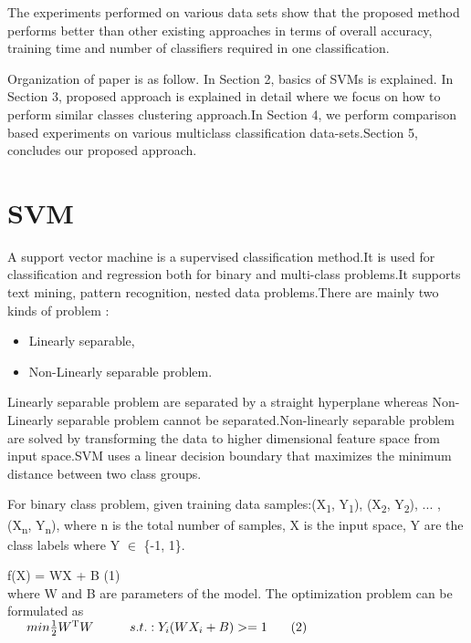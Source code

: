 \documentclass[a4paper, 10pt, conference]{ieeeconf}      %
\begin{document}
The experiments performed on various data sets show that the proposed method performs better than other existing approaches in terms of overall accuracy,  training time and number of classifiers required in one classification.

\par
Organization of paper is as follow. In Section 2, basics of SVMs is explained. In Section 3, proposed approach is explained in detail where we focus on how to perform similar classes clustering approach.In Section 4, we perform comparison based experiments on various multiclass classification data-sets.Section 5, concludes our proposed approach.


\section{SVM}

A support vector machine is a supervised classification method.It is used for classification and regression both for binary and multi-class problems.It supports text mining, pattern recognition, nested data problems.There are mainly two kinds of problem : \begin{itemize}
\item Linearly separable, 
\item Non-Linearly separable problem.
\end{itemize}
Linearly separable problem are separated by a straight hyperplane whereas Non-Linearly separable problem cannot be separated.Non-linearly separable problem are solved by transforming the data to higher dimensional feature space from input space.SVM uses a linear decision boundary that maximizes the minimum distance between two class groups.
\par
For binary class problem, given training data samples:(X\textsubscript{1}, Y\textsubscript{1}), (X\textsubscript{2}, Y\textsubscript{2}), ... , (X\textsubscript{n}, Y\textsubscript{n}), where  n is the total number of samples, X is the input space, Y are the class labels where Y $\in$ \{-1, 1\}.

\hspace{2.5cm}f(X) = WX + B \hspace{3cm}(1) \\
where W and B are parameters of the model.
The optimization problem can be formulated as \\

$\hspace{0.5cm} min\frac{1}{2}W\textsuperscript{T}W\hspace{1cm}
s.t.:Y_{i}(WX_{i}+B) >=1 \hspace{0.65cm}(2)$ \\
\end{document}
